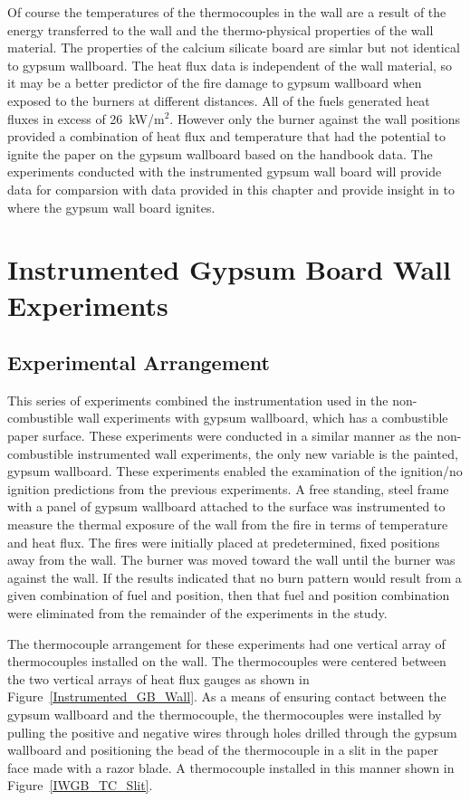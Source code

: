 \documentclass[twoside]{uocthesis}
\begin{document}
{Of course the temperatures of the thermocouples in the wall are a result of the energy transferred to the wall and the thermo-physical properties of the wall material. The properties of the calcium silicate board are simlar but not identical to gypsum wallboard.  The heat flux data is independent of the wall material, so it may be a better predictor of the fire damage to gypsum wallboard when exposed to the burners at different distances.    All of the fuels generated heat fluxes in excess of 26~kW/m$^2$.  However only the burner against the wall positions provided a combination of heat flux and temperature that had the potential to ignite the paper on the gypsum wallboard based on the handbook data.  The experiments conducted with the instrumented gypsum wall board will provide data for comparsion with data provided in this chapter and provide insight in to where the gypsum wall board ignites. 


\chapter{Instrumented Gypsum Board Wall Experiments}

\section{Experimental Arrangement}
This series of experiments combined the instrumentation used in the non-combustible wall experiments with gypsum wallboard, which has a combustible paper surface. These experiments were conducted in a similar manner as the non-combustible instrumented wall experiments, the only new variable is the painted, gypsum wallboard. These experiments enabled the examination of the ignition/no ignition predictions from the previous experiments.  A free standing, steel frame with a panel of gypsum wallboard attached to the surface was instrumented to measure the thermal exposure of the wall from the fire in terms of temperature and heat flux.  The fires were initially placed at predetermined, fixed positions away from the wall. The burner was moved toward the wall until the burner was against the wall.  If the results indicated that no burn pattern would result from a given combination of fuel and position, then that fuel and position combination were eliminated from the remainder of the experiments in the study.

The thermocouple arrangement for these experiments had one vertical array of thermocouples installed on the wall.  The thermocouples were centered between the two vertical arrays of heat flux gauges as shown in Figure~\ref{Instrumented_GB_Wall}.  As a means of ensuring contact between the gypsum wallboard and the thermocouple, the thermocouples were installed by pulling the positive and negative wires through holes drilled through the gypsum wallboard and positioning the bead of the thermocouple in a slit in the paper face made with a razor blade.  A thermocouple installed in this manner shown in Figure~\ref{IWGB_TC_Slit}.

}
\end{document}
